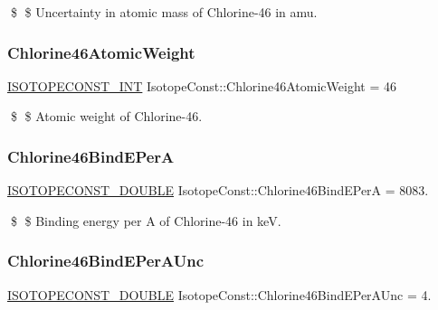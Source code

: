 \$ \$ Uncertainty in atomic mass of Chlorine-\/46 in amu. \mbox{\label{group___isotope_const-_chlorine-_cl46_gaaaec5cea09723c5ccdd59cd154f13a29}} 
\subsubsection{\texorpdfstring{Chlorine46\+Atomic\+Weight}{Chlorine46AtomicWeight}}
{\footnotesize\ttfamily \mbox{\hyperlink{group___isotope_const-_macros_ga5f18360b3e99483a35c32d789e62621c}{I\+S\+O\+T\+O\+P\+E\+C\+O\+N\+S\+T\+\_\+\+I\+NT}} Isotope\+Const\+::\+Chlorine46\+Atomic\+Weight = 46}

\$ \$ Atomic weight of Chlorine-\/46. \mbox{\label{group___isotope_const-_chlorine-_cl46_ga67dc17f6585b09659a16e407ad019641}} 
\subsubsection{\texorpdfstring{Chlorine46\+Bind\+E\+PerA}{Chlorine46BindEPerA}}
{\footnotesize\ttfamily \mbox{\hyperlink{group___isotope_const-_macros_ga8f45a7272ce02c0b4c65c44636ed719a}{I\+S\+O\+T\+O\+P\+E\+C\+O\+N\+S\+T\+\_\+\+D\+O\+U\+B\+LE}} Isotope\+Const\+::\+Chlorine46\+Bind\+E\+PerA = 8083.}

\$ \$ Binding energy per A of Chlorine-\/46 in keV. \mbox{\label{group___isotope_const-_chlorine-_cl46_gab42cef4c67f2967fe226757f33876b6e}} 
\subsubsection{\texorpdfstring{Chlorine46\+Bind\+E\+Per\+A\+Unc}{Chlorine46BindEPerAUnc}}
{\footnotesize\ttfamily \mbox{\hyperlink{group___isotope_const-_macros_ga8f45a7272ce02c0b4c65c44636ed719a}{I\+S\+O\+T\+O\+P\+E\+C\+O\+N\+S\+T\+\_\+\+D\+O\+U\+B\+LE}} Isotope\+Const\+::\+Chlorine46\+Bind\+E\+Per\+A\+Unc = 4.}

